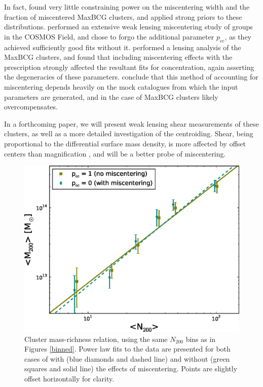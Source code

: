 In fact, \citet{Johnston07} found very little constraining power on the miscentering width and the fraction of miscentered MaxBCG clusters, and applied strong priors to these distributions. \citet{George12} performed an extensive weak lensing miscentering study of groups in the \ac{COSMOS} Field, and chose to forgo the additional parameter $p_{\mathrm{cc}}$, as they achieved sufficiently good fits without it. \citet{Mandelbaum08b} performed a lensing analysis of the MaxBCG clusters, and found that including miscentering effects with the \citet{Johnston07} prescription strongly affected the resultant fits for concentration, again asserting the degeneracies of these parameters. \citet{Mandelbaum08b} conclude that this method of accounting for miscentering depends heavily on the mock catalogues from which the input parameters are generated, and in the case of MaxBCG clusters likely overcompensates. 

In a forthcoming paper, we will present weak lensing shear measurements of these clusters, as well as a more detailed investigation of the centroiding. Shear, being proportional to the differential surface mass density, is more affected by offset centers than magnification \citep{Johnston07}, and will be a better probe of miscentering.




\begin{figure}
\begin{center}
\includegraphics[scale=0.7]{plots_ch3/MassRich_2to1000_U.eps}
\caption[Mass-Richness Relation from Magnification]{Cluster mass-richness relation, using the same $N_{200}$ bins as in Figures \ref{binned}. Power law fits to the data are presented for both cases of with (blue diamonds and dashed line) and without (green squares and solid line) the effects of miscentering. Points are slightly offset horizontally for clarity.}
\label{massrich}
\end{center}
\end{figure}


